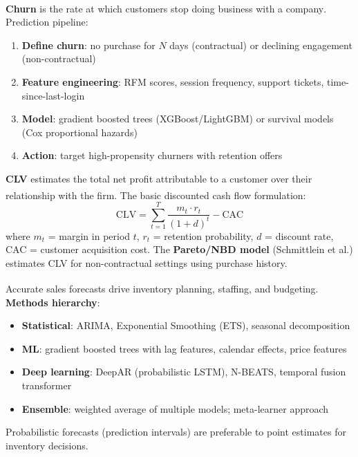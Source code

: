\begin{tcbitemize}[ skin=sectionraster ]

    \tcbitem[title=Customer Churn Prediction, raster multicolumn=3]
    \textbf{Churn} is the rate at which customers stop doing business with a company\textsuperscript{\cite[][pp.~145--150]{chaffeyDigitalBusinessECommerce2019}}.
    Prediction pipeline:
    \begin{enumerate}
        \item \textbf{Define churn}: no purchase for $N$ days (contractual) or declining engagement (non-contractual)
        \item \textbf{Feature engineering}: RFM scores, session frequency, support tickets, time-since-last-login
        \item \textbf{Model}: gradient boosted trees (XGBoost/LightGBM) or survival models (Cox proportional hazards)
        \item \textbf{Action}: target high-propensity churners with retention offers
    \end{enumerate}

    \tcbitem[title=Customer Lifetime Value (CLV), raster multicolumn=3]
    \textbf{CLV} estimates the total net profit attributable to a customer over their relationship with the firm\textsuperscript{\cite[][pp.~152--157]{chaffeyDigitalBusinessECommerce2019}}.
    The basic discounted cash flow formulation:
    \begin{equation}
        \text{CLV} = \sum_{t=1}^{T} \frac{m_t \cdot r_t}{(1+d)^t} - \text{CAC}
    \end{equation}
    where $m_t$ = margin in period $t$, $r_t$ = retention probability, $d$ = discount rate, CAC = customer acquisition cost.
    The \textbf{Pareto/NBD model} (Schmittlein et al.) estimates CLV for non-contractual settings using purchase history.

    \tcbitem[title=Sales Forecasting, raster multicolumn=3]
    Accurate sales forecasts drive inventory planning, staffing, and budgeting\textsuperscript{\cite[][pp.~4--8]{hyndmanForecastingPrinciples2021}}.
    \textbf{Methods hierarchy}:
    \begin{itemize}
        \item \textbf{Statistical}: ARIMA, Exponential Smoothing (ETS), seasonal decomposition
        \item \textbf{ML}: gradient boosted trees with lag features, calendar effects, price features
        \item \textbf{Deep learning}: DeepAR (probabilistic LSTM), N-BEATS, temporal fusion transformer
        \item \textbf{Ensemble}: weighted average of multiple models; meta-learner approach
    \end{itemize}
    Probabilistic forecasts (prediction intervals) are preferable to point estimates for inventory decisions.


\end{tcbitemize}
